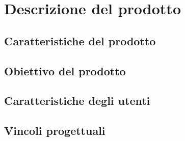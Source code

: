 \section{Descrizione del prodotto}
\subsection{Caratteristiche del prodotto}
\subsection{Obiettivo del prodotto}
\subsection{Caratteristiche degli utenti}
\subsection{Vincoli progettuali}